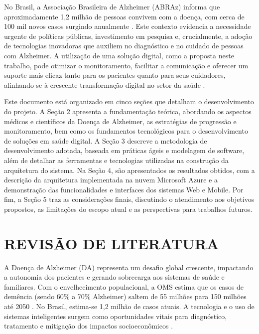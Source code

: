 \documentclass[conference,a4paper,10pt]{IEEETran}
\begin{document}
No Brasil, a Associação Brasileira de Alzheimer (ABRAz) informa que aproximadamente 1,2 milhão de pessoas convivem com a doença, com cerca de 100 mil novos casos surgindo anualmente \cite{BVSMS2023Alzheimer}. Este contexto evidencia a necessidade urgente de políticas públicas, investimento em pesquisa \cite{drew_Alzheimers, Makin2025Dementia, FDA2023Alzheimers} e, crucialmente, a adoção de tecnologias inovadoras que auxiliem no diagnóstico e no cuidado de pessoas com Alzheimer. A utilização de uma solução digital, como a proposta neste trabalho, pode otimizar o monitoramento, facilitar a comunicação e oferecer um suporte mais eficaz tanto para os pacientes quanto para seus cuidadores, alinhando-se à crescente transformação digital no setor da saúde \cite{carvalho_Clinical, lv_iCare, Shah2023ReactNative}.

Este documento está organizado em cinco seções que detalham o desenvolvimento do projeto. A Seção 2 apresenta a fundamentação teórica, abordando os aspectos médicos e científicos da Doença de Alzheimer, as estratégias de progressão e monitoramento, bem como os fundamentos tecnológicos para o desenvolvimento de soluções em saúde digital. A Seção 3 descreve a metodologia de desenvolvimento adotada, baseada em práticas ágeis e modelagem de software, além de detalhar as ferramentas e tecnologias utilizadas na construção da arquitetura do sistema. Na Seção 4, são apresentados os resultados obtidos, com a descrição da arquitetura implementada na nuvem Microsoft Azure e a demonstração das funcionalidades e interfaces dos sistemas Web e Mobile. Por fim, a Seção 5 traz as considerações finais, discutindo o atendimento aos objetivos propostos, as limitações do escopo atual e as perspectivas para trabalhos futuros.




\section{REVISÃO DE LITERATURA}\label{sec:revlit}
A Doença de Alzheimer (DA) representa um desafio global crescente, impactando a autonomia dos pacientes e gerando sobrecarga aos sistemas de saúde e familiares. Com o envelhecimento populacional, a OMS estima que os casos de demência (sendo 60\% a 70\% Alzheimer) saltem de 55 milhões para 150 milhões até 2050 \cite{Scheltens2021Alzheimer}. No Brasil, estima-se 1,2 milhão de casos atuais. A tecnologia e o uso de sistemas inteligentes surgem como oportunidades vitais para diagnóstico, tratamento e mitigação dos impactos socioeconômicos \cite{carvalho_Clinical}.
\end{document}
